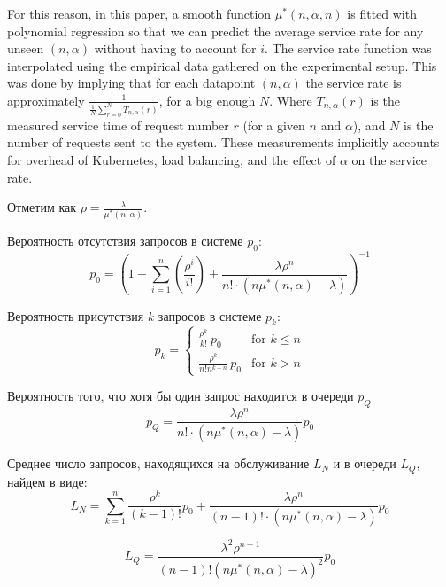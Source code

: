 \documentclass[12pt]{article}
\begin{document}
For this reason, in this paper, a smooth function $\mu^{*}\left(n,\alpha,n\right)$ is fitted with polynomial regression so that we can predict the average service rate for any unseen $(n,\alpha)$ without having to account for $i$. The service rate function was interpolated using the empirical data gathered on the experimental setup. This was done by implying that for each datapoint $(n,\alpha)$ the service rate is approximately $\frac{1}{\frac{1}{N}\sum_{r=0}^{N} T_{n,\alpha}(r)}$, for a big enough $N$. Where $T_{n,\alpha}(r)$ is the measured service time of request number $r$ (for a given $n$ and $\alpha$), and $N$ is the number of requests sent to the system. These measurements implicitly accounts for overhead of Kubernetes, load balancing, and the effect of $\alpha$ on the service rate.

Отметим как $\rho=\frac{\lambda}{\mu^{*}(n,\alpha)}$.

Вероятность отсутствия запросов в системе $p_0$:
\begin{equation}
  p_0=\left(
  1
  + \sum_{i=1}^{n}\left(\frac{\rho^{i}}{i!}\right)
  +\frac{\lambda\rho^{n}}{n! \cdot \left(n\mu^{*}(n,\alpha)-\lambda\right)}
  \right)^{-1}
  \label{eq:p0}
\end{equation}

Вероятность присутствия $k$ запросов в системе $p_k$:
\begin{equation}
  p_k = \left\{ \begin{array}{ll}
    \frac{\rho^{k}}{k!} \, p_0         & \text{for } k \leq n \\[11pt]
    \frac{\rho^{k}}{n! n^{k-n}} \, p_0 & \text{for } k > n
  \end{array} \right.
  \label{eq:p_k}
\end{equation}

Вероятность того, что хотя бы один запрос находится в очереди $p_Q$
\begin{equation}
  p_Q=\frac{\lambda\rho^{n}} {n!\cdot\left(n\mu^{*}(n,\alpha)-\lambda\right)} p_0
  \label{eq:p_Q}
\end{equation}


Среднее число запросов, находящихся на обслуживание $L_N$ и в очереди $L_Q$, найдем в виде:
\begin{equation}
  L_N =
  \sum_{k=1}^{n} \frac{\rho^k} {(k-1)!}
  p_0
  +\frac{\lambda \rho^n} {\left(n-1\right)! \cdot \left(n\mu^{*}(n,\alpha)-\lambda\right)}
  p_0
\end{equation}

\begin{equation}
  L_Q =
  \frac{\lambda^2 \rho^{n-1}}
  {\left(n-1\right)!\left(n\mu^{*}(n,\alpha)-\lambda\right)^2}
  p_0
\end{equation}
\end{document}
